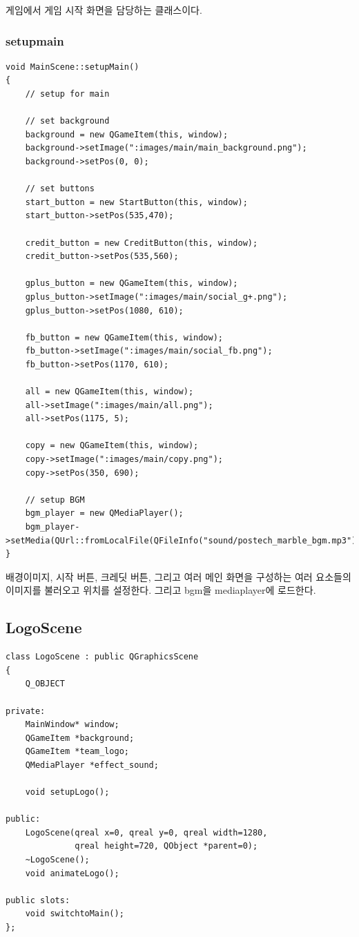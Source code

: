 \documentclass[10pt,oneside,a4paper,titlepage]{article}
\begin{document}
게임에서 게임 시작 화면을 담당하는 클래스이다. 

\subsubsection{setupmain}

\begin{lstlisting}
void MainScene::setupMain()
{
    // setup for main

    // set background
    background = new QGameItem(this, window);
    background->setImage(":images/main/main_background.png");
    background->setPos(0, 0);

    // set buttons
    start_button = new StartButton(this, window);
    start_button->setPos(535,470);

    credit_button = new CreditButton(this, window);
    credit_button->setPos(535,560);

    gplus_button = new QGameItem(this, window);
    gplus_button->setImage(":images/main/social_g+.png");
    gplus_button->setPos(1080, 610);

    fb_button = new QGameItem(this, window);
    fb_button->setImage(":images/main/social_fb.png");
    fb_button->setPos(1170, 610);

    all = new QGameItem(this, window);
    all->setImage(":images/main/all.png");
    all->setPos(1175, 5);

    copy = new QGameItem(this, window);
    copy->setImage(":images/main/copy.png");
    copy->setPos(350, 690);

    // setup BGM
    bgm_player = new QMediaPlayer();
    bgm_player->setMedia(QUrl::fromLocalFile(QFileInfo("sound/postech_marble_bgm.mp3").absoluteFilePath()));
}

\end{lstlisting}

배경이미지, 시작 버튼, 크레딧 버튼, 그리고 여러 메인 화면을 구성하는 여러 요소들의 이미지를 불러오고 위치를 설정한다. 그리고 bgm을 mediaplayer에 로드한다.

\subsection{LogoScene}

\begin{lstlisting}
class LogoScene : public QGraphicsScene
{
    Q_OBJECT

private:
    MainWindow* window;
    QGameItem *background;
    QGameItem *team_logo;
    QMediaPlayer *effect_sound;

    void setupLogo();

public:
    LogoScene(qreal x=0, qreal y=0, qreal width=1280,
              qreal height=720, QObject *parent=0);
    ~LogoScene();
    void animateLogo();

public slots:
    void switchtoMain();
};
\end{lstlisting}
\end{document}

